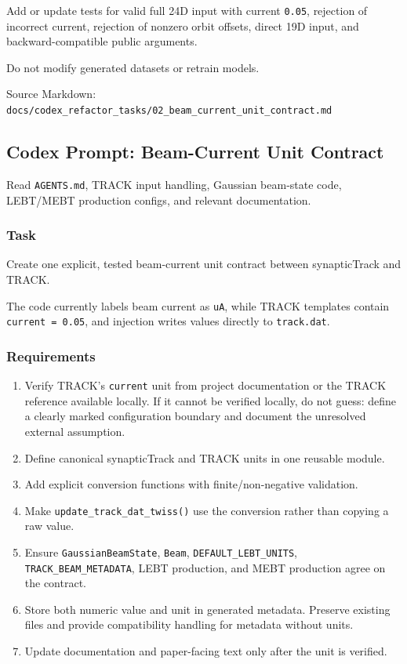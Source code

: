 \documentclass[
]{article}
\providecommand{\tightlist}{%
  \setlength{\itemsep}{0pt}\setlength{\parskip}{0pt}}
\begin{document}
Add or update tests for valid full 24D input with current \texttt{0.05},
rejection of incorrect current, rejection of nonzero orbit offsets,
direct 19D input, and backward-compatible public arguments.

Do not modify generated datasets or retrain models.

Source Markdown:
\texttt{docs/codex\_refactor\_tasks/02\_beam\_current\_unit\_contract.md}

\hypertarget{codex-prompt-beam-current-unit-contract}{%
\subsection{Codex Prompt: Beam-Current Unit
Contract}\label{codex-prompt-beam-current-unit-contract}}

Read \texttt{AGENTS.md}, TRACK input handling, Gaussian beam-state code,
LEBT/MEBT production configs, and relevant documentation.

\hypertarget{task-1}{%
\subsubsection{Task}\label{task-1}}

Create one explicit, tested beam-current unit contract between
synapticTrack and TRACK.

The code currently labels beam current as \texttt{uA}, while TRACK
templates contain \texttt{current\ =\ 0.05}, and injection writes values
directly to \texttt{track.dat}.

\hypertarget{requirements-1}{%
\subsubsection{Requirements}\label{requirements-1}}

\begin{enumerate}
\def\labelenumi{\arabic{enumi}.}
\tightlist
\item
  Verify TRACK's \texttt{current} unit from project documentation or the
  TRACK reference available locally. If it cannot be verified locally,
  do not guess: define a clearly marked configuration boundary and
  document the unresolved external assumption.
\item
  Define canonical synapticTrack and TRACK units in one reusable module.
\item
  Add explicit conversion functions with finite/non-negative validation.
\item
  Make \texttt{update\_track\_dat\_twiss()} use the conversion rather
  than copying a raw value.
\item
  Ensure \texttt{GaussianBeamState}, \texttt{Beam},
  \texttt{DEFAULT\_LEBT\_UNITS}, \texttt{TRACK\_BEAM\_METADATA}, LEBT
  production, and MEBT production agree on the contract.
\item
  Store both numeric value and unit in generated metadata. Preserve
  existing files and provide compatibility handling for metadata without
  units.
\item
  Update documentation and paper-facing text only after the unit is
  verified.
\end{enumerate}
\end{document}
